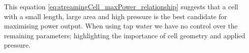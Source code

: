 This equation \eqref{eq:streamingCell_maxPower_relationship} suggests that a cell with a small length, large area and high pressure is the best candidate for maximising power output.
When using tap water we have no control over the remaining parameters; highlighting the importance of cell geometry and applied pressure.









